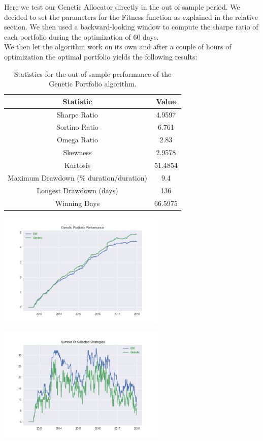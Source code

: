 Here we test our Genetic Allocator directly in the out of sample period. We decided to set the parameters for the Fitness function as explained in the relative section. We then used a backward-looking window to compute the sharpe ratio of each portfolio during the optimization of 60 days.\\
We then let the algorithm work on its own and after a couple of hours of optimization the optimal portfolio yields the following results:

\begin{table}
	\centering
	\begin{tabular}{c|c}
		\textbf{Statistic} & \textbf{Value} \\\hline
		Sharpe Ratio & 4.9597 \\ 
		Sortino Ratio & 6.761 \\ 
		Omega Ratio & 2.83 \\ 
		Skewness & 2.9578  \\ 
		Kurtosis & 51.4854 \\ 
		Maximum Drawdown (\% duration/duration) & 9.4 \\ 
		Longest Drawdown (days) & 136 \\ 
		Winning Days & 66.5975 \\ 
	\end{tabular}
	\caption{\label{tab:gentic_OOS} Statistics for the out-of-sample performance of the Genetic Portfolio algorithm.}
\end{table}


\begin{center}
	\centering
	\includegraphics[width=0.6\textwidth]{Genetic_Algo/Try_1_oos.png}
	\label{Genetic_Line}
\end{center}

\begin{center}
	\centering
	\includegraphics[width=0.6\textwidth]{Genetic_Algo/Try_1_num_strats.png}
	\label{Genetic_num_strats}
\end{center}

